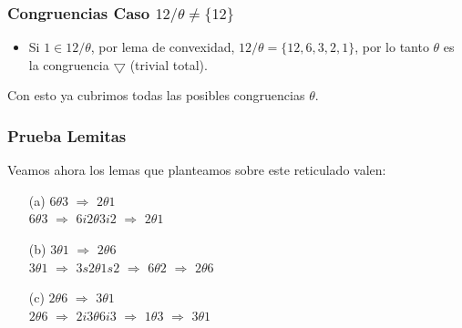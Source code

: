 \documentclass{beamer}
\begin{document}
\begin{frame}
\frametitle{Congruencias Caso $12/\theta \not = \{12\}$}
\begin{itemize}
\item     Si $1 \in 12/\theta$, por lema de convexidad, $12/\theta = \{12,6,3,2,1\}$, por lo tanto $\theta$ es la congruencia $\bigtriangledown$ (trivial total).\\
\end{itemize}
Con esto ya cubrimos todas las posibles congruencias $\theta$.
\end{frame}


\begin{frame}
\frametitle{Prueba Lemitas}
Veamos ahora los lemas que planteamos sobre este reticulado valen:\\
\begin{enumerate}
\item[(a)] $6\theta 3$ $\Rightarrow$ $2\theta 1$\\
       $6\theta 3$ $\Rightarrow$ $6i2\theta 3i2$ $\Rightarrow$ $2\theta 1$\\

\item[(b)] $3\theta 1$ $\Rightarrow$ $2\theta 6$\\
       $3\theta 1$ $\Rightarrow$ $3s2\theta 1s2$ $\Rightarrow$ $6\theta 2$ $\Rightarrow$ $2\theta 6$\\
       
\item[(c)] $2\theta 6$ $\Rightarrow$ $3\theta 1$\\
       $2\theta 6$ $\Rightarrow$ $2i3\theta 6i3$ $\Rightarrow$ $1\theta 3$ $\Rightarrow$ $3\theta 1$\\

\end{enumerate}
\end{frame}
\end{document}
